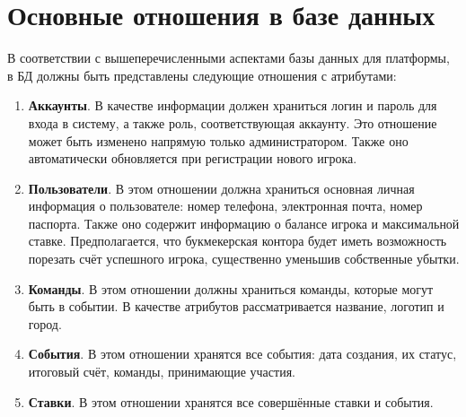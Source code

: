 \section{Основные отношения в базе данных}
В соответствии с вышеперечисленными аспектами базы данных для платформы, в БД должны быть представлены следующие отношения с атрибутами:
\begin{enumerate}
	\item \textbf{Аккаунты}. В качестве информации должен храниться логин и пароль для входа в систему, а также роль, соответствующая аккаунту. Это отношение может быть изменено напрямую только администратором. Также оно автоматически обновляется при регистрации нового игрока.
	\item \textbf{Пользователи}. В этом отношении должна храниться основная личная информация о пользователе: номер телефона, электронная почта, номер паспорта. Также оно содержит информацию о балансе игрока и максимальной ставке. Предполагается, что букмекерская контора будет иметь возможность порезать счёт успешного игрока, существенно уменьшив собственные убытки.
	\item \textbf{Команды}. В этом отношении должны храниться команды, которые могут быть в событии. В качестве атрибутов рассматривается название, логотип и город.
	\item \textbf{События}. В этом отношении хранятся все события: дата создания, их статус, итоговый счёт, команды, принимающие участия. 
	\item \textbf{Ставки}. В этом отношении хранятся все совершённые ставки и события.
\end{enumerate}

